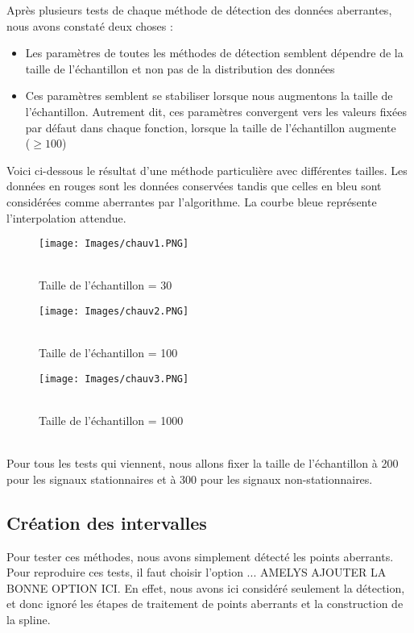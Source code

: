 \documentclass[a4paper,12pt]{article} %
\begin{document}
    
        Après plusieurs tests de chaque méthode de détection des données aberrantes, nous avons constaté deux choses :
        \begin{itemize}
        \item Les paramètres de toutes les méthodes de détection semblent dépendre de la taille de l’échantillon et non pas de la distribution des données 
        \item Ces paramètres semblent se stabiliser lorsque nous augmentons la taille de l’échantillon. Autrement dit, ces paramètres convergent vers les valeurs fixées par défaut dans chaque fonction, lorsque la taille de l’échantillon augmente \\($\ge 100 $)
        \end{itemize}
        Voici ci-dessous le résultat d'une méthode particulière avec différentes tailles. Les données en rouges sont les données conservées tandis que celles en bleu sont considérées comme aberrantes par l'algorithme. La courbe bleue représente l'interpolation attendue.
        \begin{figure}[H] %
        \texttt{[image: Images/chauv1.PNG]} %
        \caption{\\Taille de l’échantillon = 30} %
        \label{m15} %
        \endminipage
        \texttt{[image: Images/chauv2.PNG]}  
        \caption{\\Taille de l’échantillon = 100}
        \label{m5}
        \endminipage
        \texttt{[image: Images/chauv3.PNG]}  
        \caption{\\Taille de l’échantillon = 1000}
        \label{m35}
        \endminipage
        
        \end{figure}
        \\
        
        Pour tous les tests qui viennent, nous allons fixer la taille de l’échantillon à 200 pour les signaux stationnaires et à 300 pour les signaux non-stationnaires.
        
       \subsection{Création des intervalles}
            Pour tester ces méthodes, nous avons simplement détecté les points aberrants. Pour reproduire ces tests, il faut choisir l'option ... AMELYS AJOUTER LA BONNE OPTION ICI. En effet, nous avons ici considéré seulement la détection, et donc ignoré les étapes de traitement de points aberrants et la construction de la spline.
            
\end{document}

